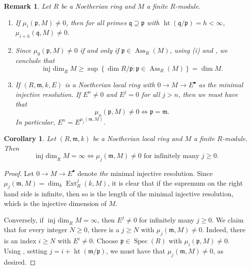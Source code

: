 \documentclass[10pt]{article}
\theoremstyle{thmstyle}
\theoremstyle{defstyle}
\newtheorem{corollary}[theorem]{Corollary}
\newtheorem{remark}[theorem]{Remark}
\newcommand{\Spec}{\operatorname{Spec}}
\newcommand{\frakm}{\mathfrak{m}} %
\newcommand{\frakp}{\mathfrak{p}} %
\newcommand{\frakq}{\mathfrak{q}} %
\renewcommand{\ge}{\geqslant}
\newcommand{\Ext}{\operatorname{Ext}}
\newcommand{\Ass}{\operatorname{Ass}}
\newcommand{\injdim}{\operatorname{inj~dim}}
\newcommand{\hght}{\operatorname{ht}}
\begin{document}
\begin{remark}
    Let $R$ be a Noetherian ring and $M$ a finite $R$-module. 
    \begin{enumerate}[label=(\roman*)]
        \item If $\mu_i(\frakp, M)\ne 0$, then for all primes $\frakq\supseteq\frakp$ with $\hght(\frakq/\frakp) = h < \infty$, $\mu_{i + h}(\frakq, M)\ne 0$.
        \item Since $\mu_0(\frakp, M)\ne 0$ if and only if $\frakp\in\Ass_R(M)$, using (i) and , we conclude that 
        \begin{equation*}
            \injdim_R M\ge\sup\left\{\dim R/\frakp\colon\frakp\in\Ass_R(M)\right\} = \dim M.
        \end{equation*}
        \item If $(R,\frakm, k, E)$ is a Noetherian local ring with $0\to M\to E^\bullet$ as \emph{the} minimal injective resolution. If $E^n\ne 0$ and $E^j = 0$ for all $j > n$, then we must have that 
        \begin{equation*}
            \mu_n(\frakp, M)\ne 0 \iff \frakp = \frakm.
        \end{equation*}
        In particular, $E^n = E^{\mu_j(\frakm, M)}$.
    \end{enumerate}
\end{remark}

\begin{corollary}
    Let $(R, \frakm, k)$ be a Noetherian local ring and $M$ a finite $R$-module. Then 
    \begin{equation*}
        \injdim_R M = \infty \iff \mu_j(\frakm, M)\ne 0 \text{ for infinitely many }j\ge 0.
    \end{equation*}
\end{corollary}
\begin{proof}
    Let $0\to M\to E^\bullet$ denote \emph{the} minimal injective resolution. Since $\mu_j(\frakm, M) = \dim_k\Ext^j_R(k, M)$, it is clear that if the supremum on the right hand side is infinite, then so is the length of the minimal injective resolution, which is the injective dimension of $M$.

    Conversely, if $\injdim_R M = \infty$, then $E^j\ne 0$ for infinitely many $j\ge 0$. We claim that for every integer $N\ge 0$, there is a $j\ge N$ with $\mu_j(\frakm, M)\ne 0$. Indeed, there is an index $i\ge N$ with $E^i\ne 0$. Choose $\frakp\in\Spec(R)$ with $\mu_i(\frakp, M)\ne 0$. Using , setting $j = i + \hght(\frakm/\frakp)$, we must have that $\mu_j(\frakm, M)\ne 0$, as desired.
\end{proof}
\end{document}
